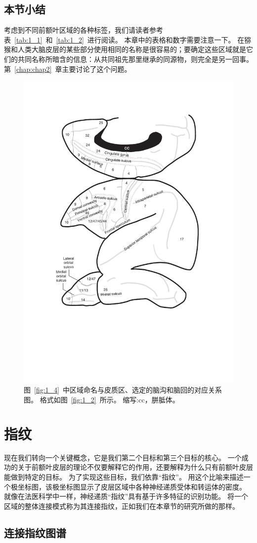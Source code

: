 \subsection{本节小结}
考虑到不同前额叶区域的各种标签，我们请读者参考表~\ref{tab:1_1}~和~\ref{tab:1_2}~进行阅读。
本章中的表格和数字需要注意一下。
在猕猴和人类大脑皮层的某些部分使用相同的名称是很容易的；要确定这些区域就是它们的共同名称所暗含的信息：从共同祖先那里继承的同源物，则完全是另一回事。
第~\ref{chap:chap2}~章主要讨论了这个问题。


\begin{figure}[!htb]
	\centering
	\includegraphics[width=0.5\linewidth]{chap1/1_5}
	\caption{图~\ref{fig:1_4}~中区域命名与皮质区、选定的脑沟和脑回的对应关系图。
		格式如图~\ref{fig:1_2}~所示。
		缩写:cc，胼胝体。\label{fig:1_5}}
\end{figure}



\section{指纹}

现在我们转向一个关键概念，它是我们第二个目标和第三个目标的核心。
一个成功的关于前额叶皮层的理论不仅要解释它的作用，还要解释为什么只有前额叶皮层能做到特定的目标。
为了实现这些目标，我们依靠“指纹”。
用这个比喻来描述一个极坐标图\cite{zilles2001cyto}，该极坐标图显示了皮层区域中各种神经递质受体和转运体的密度。
就像在法医科学中一样，神经递质“指纹”具有基于许多特征的识别功能。
将一个区域的整体连接模式称为其连接指纹\cite{2002Dorsal}，正如我们在本章节的研究所做的那样。


\subsection{连接指纹图谱}

